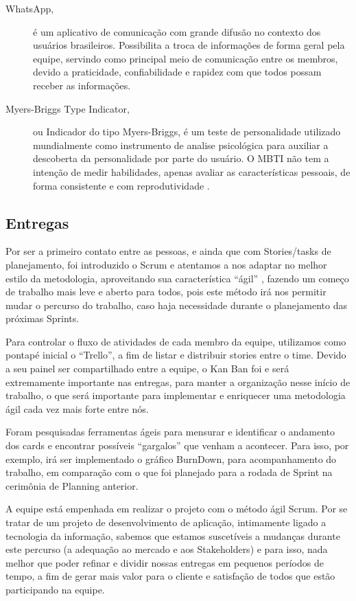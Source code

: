 \documentclass[12pt]{article}
\begin{document}
\begin{description}
 \item[WhatsApp,]   é um aplicativo de comunicação com grande difusão no contexto dos usuários brasileiros. Possibilita a troca de informações de forma geral pela equipe, servindo como principal meio de comunicação entre os membros, devido a praticidade, confiabilidade e rapidez com que todos possam receber as informações.
 \newline
 \item[Myers-Briggs Type Indicator,] ou Indicador do tipo Myers-Briggs, é um teste de personalidade utilizado mundialmente como instrumento de analise psicológica para auxiliar a descoberta da personalidade por parte do usuário. O MBTI não tem a intenção de medir habilidades, apenas  avaliar as características pessoais, de forma consistente e com reprodutividade \cite{myers1980myers}.
\end{description}

\subsection{Entregas}
Por ser a primeiro contato entre as pessoas, e ainda que com Stories/tasks de planejamento, foi introduzido o Scrum e atentamos a nos adaptar no melhor estilo da metodologia, aproveitando sua característica “ágil” , fazendo um começo de trabalho mais leve e aberto para todos, pois este método irá nos permitir mudar o percurso do trabalho, caso haja necessidade durante o planejamento das próximas Sprints.

Para controlar o fluxo de atividades de cada membro da equipe, utilizamos como pontapé inicial o “Trello”, a fim de listar e distribuir stories entre o time. Devido a seu painel ser compartilhado entre a equipe, o Kan Ban foi e será extremamente importante nas entregas, para manter a organização nesse início de trabalho, o que será importante para implementar e enriquecer uma metodologia ágil cada vez mais forte entre nós.

Foram pesquisadas ferramentas ágeis para mensurar e identificar o andamento dos cards e encontrar possíveis “gargalos” que venham a acontecer. Para isso, por exemplo, irá ser implementado o gráfico BurnDown, para acompanhamento do trabalho, em comparação com o que foi planejado para a rodada de Sprint na cerimônia de Planning anterior.

A equipe está empenhada em realizar o projeto com o método ágil Scrum. Por se tratar de um projeto de desenvolvimento de aplicação, intimamente ligado a tecnologia da informação, sabemos que estamos suscetíveis a mudanças durante este percurso (a adequação ao mercado e aos Stakeholders) e para isso, nada melhor que poder refinar e dividir nossas entregas em pequenos períodos de tempo, a fim de gerar mais valor para o cliente e satisfação de todos que estão participando na equipe.
\end{document}
